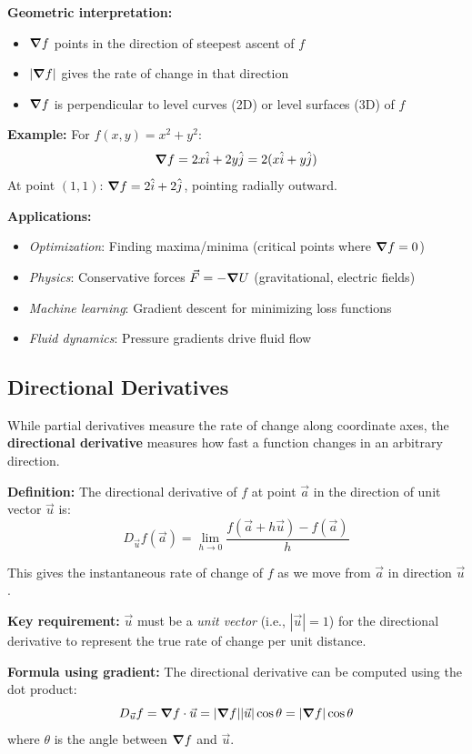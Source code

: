 \textbf{Geometric interpretation:}
\begin{itemize}
    \item $\grad f$ points in the direction of steepest ascent of $f$
    \item $|\grad f|$ gives the rate of change in that direction
    \item $\grad f$ is perpendicular to level curves (2D) or level surfaces (3D) of $f$
\end{itemize}

\textbf{Example:} For $f(x, y) = x^2 + y^2$:
\[
\grad f = 2x\hat{i} + 2y\hat{j} = 2(x\hat{i} + y\hat{j})
\]
At point $(1, 1)$: $\grad f = 2\hat{i} + 2\hat{j}$, pointing radially outward.

\textbf{Applications:}
\begin{itemize}
    \item \textit{Optimization}: Finding maxima/minima (critical points where $\grad f = 0$)
    \item \textit{Physics}: Conservative forces $\vec{F} = -\grad U$ (gravitational, electric fields)
    \item \textit{Machine learning}: Gradient descent for minimizing loss functions
    \item \textit{Fluid dynamics}: Pressure gradients drive fluid flow
\end{itemize}

\subsection{Directional Derivatives}

While partial derivatives measure the rate of change along coordinate axes, the \textbf{directional derivative} measures how fast a function changes in an arbitrary direction.

\textbf{Definition:} The directional derivative of $f$ at point $\vec{a}$ in the direction of unit vector $\vec{u}$ is:
\[
D_{\vec{u}}f(\vec{a}) = \lim_{h \to 0} \frac{f(\vec{a} + h\vec{u}) - f(\vec{a})}{h}
\]

This gives the instantaneous rate of change of $f$ as we move from $\vec{a}$ in direction $\vec{u}$.

\textbf{Key requirement:} $\vec{u}$ must be a \textit{unit vector} (i.e., $|\vec{u}| = 1$) for the directional derivative to represent the true rate of change per unit distance.

\textbf{Formula using gradient:} The directional derivative can be computed using the dot product:
\[
D_{\vec{u}}f = \grad f \cdot \vec{u} = |\grad f||\vec{u}|\cos\theta = |\grad f|\cos\theta
\]
where $\theta$ is the angle between $\grad f$ and $\vec{u}$.


